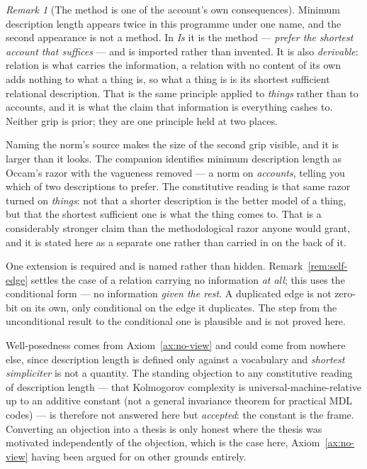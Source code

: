 \documentclass[11pt,a4paper]{article}
\theoremstyle{remark}\newtheorem{remark}[definition]{Remark}
\begin{document}
\begin{remark}[The method is one of the account's own consequences]\label{rem:mdl-ontic}
Minimum description length appears twice in this programme under one name, and the second appearance is
not a method. In \emph{Is} it is the method --- \emph{prefer the shortest account that suffices} ---
and is imported rather than invented. It is also \emph{derivable}: relation is what carries the
information, a relation with no content of its own adds nothing to what a thing is, so what a thing is
is its shortest sufficient relational description. That is the same principle applied to \emph{things}
rather than to accounts, and it is what the claim that information is everything cashes to. Neither
grip is prior; they are one principle held at two places.

Naming the norm's source makes the size of the second grip visible, and it is larger than it looks. The
companion identifies minimum description length as Occam's razor with the vagueness removed --- a norm
on \emph{accounts}, telling you which of two descriptions to prefer. The constitutive reading is that
same razor turned on \emph{things}: not that a shorter description is the better model of a thing, but
that the shortest sufficient one is what the thing comes to. That is a considerably stronger claim than
the methodological razor anyone would grant, and it is stated here as a separate one rather than
carried in on the back of it.

One extension is required and is named rather than hidden. Remark~\ref{rem:self-edge} settles the case
of a relation carrying no information \emph{at all}; this uses the conditional form --- no information
\emph{given the rest}. A duplicated edge is not zero-bit on its own, only conditional on the edge it
duplicates. The step from the unconditional result to the conditional one is plausible and is not
proved here.

Well-posedness comes from Axiom~\ref{ax:no-view} and could come from nowhere else, since description length is
defined only against a vocabulary and \emph{shortest simpliciter} is not a quantity. The standing
objection to any constitutive reading of description length --- that Kolmogorov complexity is universal-machine-relative up
to an additive constant (not a general invariance theorem for practical MDL codes) --- is therefore not answered here but \emph{accepted}: the constant is the
frame. Converting an objection into a thesis is only honest where the thesis was motivated
independently of the objection, which is the case here, Axiom~\ref{ax:no-view} having been argued for on other
grounds entirely.


\end{remark}
\end{document}
